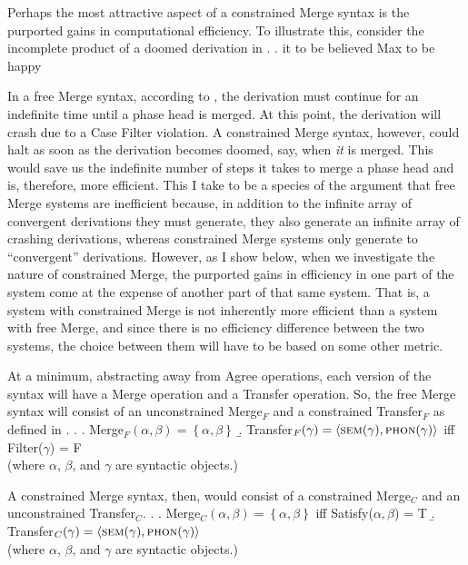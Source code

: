 Perhaps the most attractive aspect of a constrained Merge syntax is the purported gains in computational efficiency.
To illustrate this, \textcite{frampton2008crash} consider the incomplete product of a doomed derivation in \Next.
\ex. it to be believed Max to be happy

In a free Merge syntax, according to \textcite{frampton2008crash}, the derivation must continue for an indefinite time until a phase head is merged.
At this point, the derivation will crash due to a Case Filter violation.
A constrained Merge syntax, however, could halt as soon as the derivation becomes doomed, say, when \textit{it} is merged.
This would save us the indefinite number of steps it takes to merge a phase head and is, therefore, more efficient.
This I take to be a species of the argument that free Merge systems are inefficient because, in addition to the infinite array of convergent derivations they must generate, they also generate an infinite array of crashing derivations, whereas constrained Merge systems only generate to ``convergent'' derivations.
However, as I show below, when we investigate the nature of constrained Merge, the purported gains in efficiency in one part of the system come at the expense of another part of that same system.
That is, a system with constrained Merge is not inherently more efficient than a system with free Merge, and since there is no efficiency difference between the two systems, the choice between them will have to be based on some other metric.

At a minimum, abstracting away from Agree operations, each version of the syntax will have a Merge operation and a Transfer operation.
So, the free Merge syntax will consist of an unconstrained Merge$_F$ and a constrained Transfer$_F$ as defined in \Next.
\ex.
\a. Merge$_F(\alpha,\beta) = \left\{ \alpha, \beta \right\}$ 
\b. Transfer$_F(\gamma) = \langle\textsc{sem}(\gamma), \textsc{phon}(\gamma)\rangle$ iff Filter($\gamma$) = F\\
(where $\alpha$, $\beta$, and $\gamma$ are syntactic objects.)

A constrained Merge syntax, then, would consist of a constrained Merge$_C$ and an unconstrained Transfer$_C$.
\ex.
\a. Merge$_C(\alpha,\beta) =\left\{\alpha,\beta\right\}$ iff Satisfy($\alpha,\beta$) = T
\b. Transfer$_C(\gamma) = \langle\textsc{sem}(\gamma), \textsc{phon}(\gamma)\rangle$\\
(where $\alpha$, $\beta$, and $\gamma$ are syntactic objects.)

